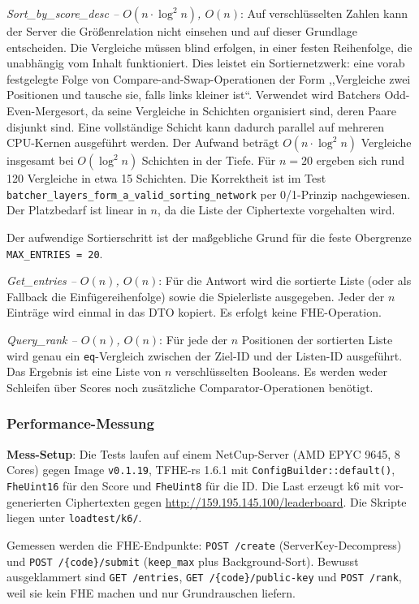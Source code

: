 \textit{Sort\_by\_score\_desc -- $O(n \cdot \log^2 n)$, $O(n)$}: Auf verschlüsselten Zahlen kann der Server die Größenrelation nicht einsehen und auf dieser Grundlage entscheiden. Die Vergleiche müssen blind erfolgen, in einer festen Reihenfolge, die unabhängig vom Inhalt funktioniert. Dies leistet ein Sortiernetzwerk: eine vorab festgelegte Folge von Compare-and-Swap-Operationen der Form ,,Vergleiche zwei Positionen und tausche sie, falls links kleiner ist``. Verwendet wird Batchers Odd-Even-Mergesort, da seine Vergleiche in Schichten organisiert sind, deren Paare disjunkt sind. Eine vollständige Schicht kann dadurch parallel auf mehreren CPU-Kernen ausgeführt werden. Der Aufwand beträgt $O(n \cdot \log^2 n)$ Vergleiche insgesamt bei $O(\log^2 n)$ Schichten in der Tiefe. Für $n = 20$ ergeben sich rund 120 Vergleiche in etwa 15 Schichten. Die Korrektheit ist im Test \texttt{batcher\_layers\_form\_a\_valid\_sorting\_network} per 0/1-Prinzip nachgewiesen. Der Platzbedarf ist linear in $n$, da die Liste der Ciphertexte vorgehalten wird.

Der aufwendige Sortierschritt ist der maßgebliche Grund für die feste Obergrenze \texttt{MAX\_ENTRIES = 20}.

\textit{Get\_entries -- $O(n)$, $O(n)$}: Für die Antwort wird die sortierte Liste (oder als Fallback die Einfügereihenfolge) sowie die Spielerliste ausgegeben. Jeder der $n$ Einträge wird einmal in das DTO kopiert. Es erfolgt keine FHE-Operation.

\textit{Query\_rank -- $O(n)$, $O(n)$}: Für jede der $n$ Positionen der sortierten Liste wird genau ein \texttt{eq}-Vergleich zwischen der Ziel-ID und der Listen-ID ausgeführt. Das Ergebnis ist eine Liste von $n$ verschlüsselten Booleans. Es werden weder Schleifen über Scores noch zusätzliche Comparator-Operationen benötigt.

\subsubsection{Performance-Messung}

\textbf{Mess-Setup}:
Die Tests laufen auf einem NetCup-Server (AMD EPYC 9645, 8 Cores) gegen Image \texttt{v0.1.19}, TFHE-rs 1.6.1 mit \texttt{ConfigBuilder::default()}, \texttt{FheUint16} für den Score und \texttt{FheUint8} für die ID. Die Last erzeugt k6 mit vor-generierten Ciphertexten gegen \url{http://159.195.145.100/leaderboard}. Die Skripte liegen unter \texttt{loadtest/k6/}.

Gemessen werden die FHE-Endpunkte: \texttt{POST /create} (ServerKey-Decompress) und \texttt{POST /\{code\}/submit} (\texttt{keep\_max} plus Background-Sort). Bewusst ausgeklammert sind \texttt{GET /entries}, \texttt{GET /\{code\}/public-key} und \texttt{POST /rank}, weil sie kein FHE machen und nur Grundrauschen liefern.

